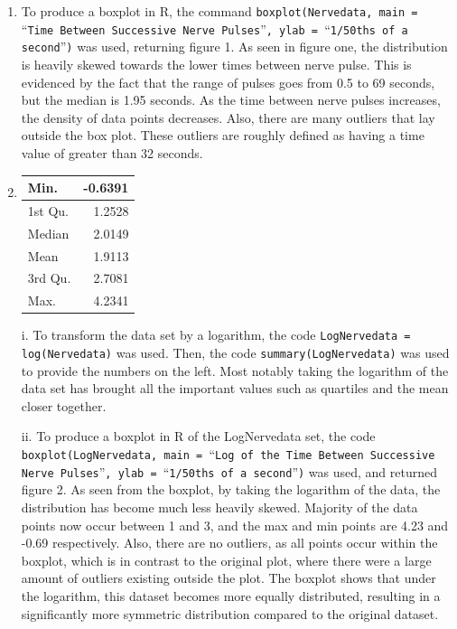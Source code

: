 \documentclass[a4paper]{article}
\newcommand{\code}{\texttt}
\begin{document}
\begin{enumerate}
\begin{enumerate}
	    \bigbreak

		\item To produce a boxplot in R, the command \code{boxplot(Nervedata, main = }\enquote{\code{Time Between Successive Nerve Pulses}}\code{, ylab = }\enquote{\code{1/50ths of a second}}\code{)} was used, returning figure 1. As seen in figure one, the distribution is heavily skewed towards the lower times between nerve pulse. This is evidenced by the fact that the range of pulses goes from 0.5 to 69 seconds, but the median is 1.95 seconds. As the time between nerve pulses increases, the density of data points decreases. Also, there are many outliers that lay outside the box plot. These outliers are roughly defined as having a time value of greater than 32 seconds.

		\bigbreak

		\item 
		\begin{adjustbox}{valign=T,raise=0ex,minipage={\linewidth}}
	        \begin{table}
				\begin{tabular}{l|r}
					Min. & -0.6391 \\
					\hline
					1st Qu. & 1.2528 \\
					\hline
					Median & 2.0149 \\
					\hline
					Mean & 1.9113 \\
					\hline
					3rd Qu. & 2.7081 \\
					\hline
					Max. & 4.2341 \\
				\end{tabular}
			\end{table}

	    		i. To transform the data set by a logarithm, the code \code{LogNervedata = log(Nervedata)} was used. Then, the code \code{summary(LogNervedata)} was used to provide the numbers on the left. Most notably taking the logarithm of the data set has brought all the important values such as quartiles and the mean closer together. 

	    		\bigbreak

				ii. To produce a boxplot in R of the LogNervedata set, the code \code{boxplot(LogNervedata, main = }\enquote{\code{Log of the Time Between Successive Nerve Pulses}}\code{, ylab = }\enquote{\code{1/50ths of a second}}\code{)} was used, and returned figure 2. As seen from the boxplot, by taking the logarithm of the data, the distribution has become much less heavily skewed. Majority of the data points now occur between 1 and 3, and the max and min points are 4.23 and -0.69 respectively. Also, there are no outliers, as all points occur within the boxplot, which is in contrast to the original plot, where there were a large amount of outliers existing outside the plot. The boxplot shows that under the logarithm, this dataset becomes more equally distributed, resulting in a significantly more symmetric distribution compared to the original dataset.


\end{adjustbox}
\end{enumerate}
\end{enumerate}
\end{document}
